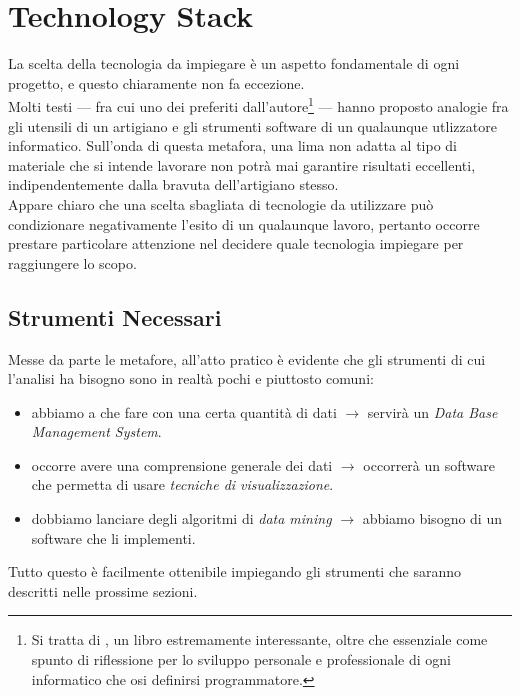 \chapter{Technology Stack}

La scelta della tecnologia da impiegare è un aspetto fondamentale di ogni progetto, e questo chiaramente non fa eccezione. \\

Molti testi --- fra cui uno dei preferiti dall'autore\footnote{Si tratta di \cite{pragmatic}, un libro estremamente interessante, oltre che essenziale come spunto di riflessione per lo sviluppo personale e professionale di ogni informatico che osi definirsi programmatore.} --- hanno proposto analogie fra gli utensili di un artigiano e gli strumenti software di un qualaunque utlizzatore informatico. Sull'onda di questa metafora, una lima non adatta al tipo di materiale che si intende lavorare non potrà mai garantire risultati eccellenti, indipendentemente dalla bravuta dell'artigiano stesso. \\

Appare chiaro che una scelta sbagliata di tecnologie da utilizzare può condizionare negativamente l'esito di un qualaunque lavoro, pertanto occorre prestare particolare attenzione nel decidere quale tecnologia impiegare per raggiungere lo scopo.

\section{Strumenti Necessari}

    Messe da parte le metafore, all'atto pratico è evidente che gli strumenti di cui l'analisi ha bisogno sono in realtà pochi e piuttosto comuni:

    \begin{itemize}
        \item abbiamo a che fare con una certa quantità di dati $\rightarrow$ servirà un \textit{Data Base Management System}.
        \item occorre avere una comprensione generale dei dati $\rightarrow$ occorrerà un software che permetta di usare \textit{tecniche di visualizzazione}.
        \item dobbiamo lanciare degli algoritmi di \textit{data mining} $\rightarrow$ abbiamo bisogno di un software che li implementi.
    \end{itemize}

    Tutto questo è facilmente ottenibile impiegando gli strumenti che saranno descritti nelle prossime sezioni.

